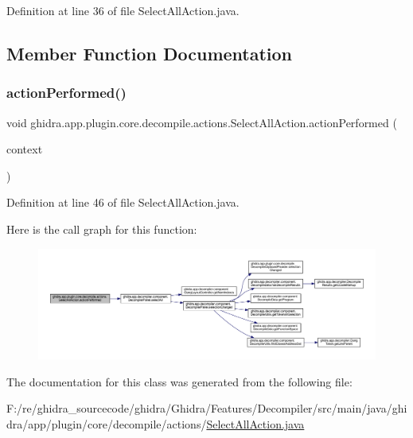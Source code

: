 Definition at line 36 of file Select\+All\+Action.\+java.



\subsection{Member Function Documentation}
\mbox{\label{classghidra_1_1app_1_1plugin_1_1core_1_1decompile_1_1actions_1_1_select_all_action_a54661ec262394a94e38f7887c4968604}} 
\subsubsection{\texorpdfstring{actionPerformed()}{actionPerformed()}}
{\footnotesize\ttfamily void ghidra.\+app.\+plugin.\+core.\+decompile.\+actions.\+Select\+All\+Action.\+action\+Performed (\begin{DoxyParamCaption}\item[{Action\+Context}]{context }\end{DoxyParamCaption})\hspace{0.3cm}{\ttfamily [inline]}}



Definition at line 46 of file Select\+All\+Action.\+java.

Here is the call graph for this function\+:
\nopagebreak
\begin{figure}[H]
\begin{center}
\leavevmode
\includegraphics[width=350pt]{classghidra_1_1app_1_1plugin_1_1core_1_1decompile_1_1actions_1_1_select_all_action_a54661ec262394a94e38f7887c4968604_cgraph}
\end{center}
\end{figure}


The documentation for this class was generated from the following file\+:\begin{DoxyCompactItemize}
\item 
F\+:/re/ghidra\+\_\+sourcecode/ghidra/\+Ghidra/\+Features/\+Decompiler/src/main/java/ghidra/app/plugin/core/decompile/actions/\mbox{\hyperlink{_select_all_action_8java}{Select\+All\+Action.\+java}}\end{DoxyCompactItemize}
